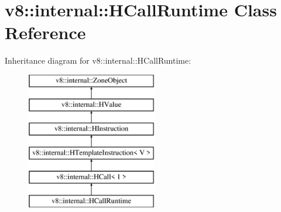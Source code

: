 \hypertarget{classv8_1_1internal_1_1_h_call_runtime}{}\section{v8\+:\+:internal\+:\+:H\+Call\+Runtime Class Reference}
\label{classv8_1_1internal_1_1_h_call_runtime}
Inheritance diagram for v8\+:\+:internal\+:\+:H\+Call\+Runtime\+:\begin{figure}[H]
\begin{center}
\leavevmode
\includegraphics[height=6.000000cm]{classv8_1_1internal_1_1_h_call_runtime}
\end{center}
\end{figure}

